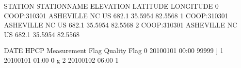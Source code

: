 \documentclass[letterpaper,10pt,english]{jupyterBook}
\begin{document}
\begin{sphinxVerbatim}[commandchars=\\\{\}]
  
\end{sphinxVerbatim}

\begin{sphinxVerbatim}[commandchars=\\\{\}]
       STATION     STATION\PYGZus{}NAME  ELEVATION  LATITUDE  LONGITUDE  \PYGZbs{}
0  COOP:310301  ASHEVILLE NC US      682.1   35.5954   \PYGZhy{}82.5568   
1  COOP:310301  ASHEVILLE NC US      682.1   35.5954   \PYGZhy{}82.5568   
2  COOP:310301  ASHEVILLE NC US      682.1   35.5954   \PYGZhy{}82.5568   

             DATE   HPCP Measurement Flag Quality Flag  
0  20100101 00:00  99999                ]               
1  20100101 01:00      0                g               
2  20100102 06:00      1                                
\end{sphinxVerbatim}
\end{document}
